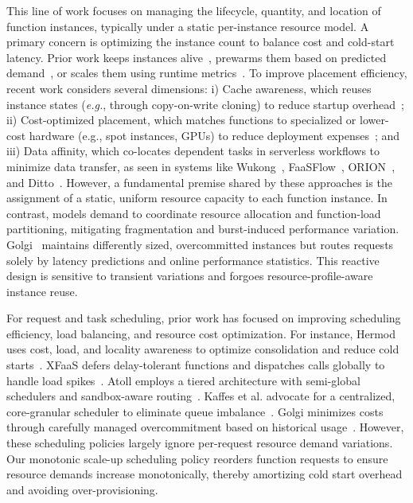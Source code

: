 This line of work focuses on managing the lifecycle, quantity, and location of function instances, typically under a static per-instance resource model. A primary concern is optimizing the instance count to balance cost and cold-start latency. Prior work keeps instances alive~\cite{ShahradFGCBCLTR20}, prewarms them based on predicted demand~\cite{ORION_MahgoubYSECB22, RoyPT22}, or scales them using runtime metrics~\cite{aws_scaling_window, aws_scaling_eq, knative_scaling, AQUATOPE_ZhouZD23}. To improve placement efficiency, recent work considers several dimensions: i) Cache awareness, which reuses instance states (\emph{e.g.}, through copy-on-write cloning) to reduce startup overhead~\cite{SOCK_OakesYZHHAA18, li2022help}; ii) Cost-optimized placement, which matches functions to specialized or lower-cost hardware (e.g., spot instances, GPUs) to reduce deployment expenses~\cite{RoyPT22, DuLJXZC22}; and iii) Data affinity, which co-locates dependent tasks in serverless workflows to minimize data transfer, as seen in systems like Wukong~\cite{Wukong_CarverZWAWC20}, FaaSFlow~\cite{FaaSFlow22}, ORION~\cite{ORION_MahgoubYSECB22}, and Ditto~\cite{JinZXZHLJ23}. However, a fundamental premise shared by these approaches is the assignment of a static, uniform resource capacity to each function instance. In contrast, \sysname models demand to coordinate resource allocation and function-load partitioning, mitigating fragmentation and burst-induced performance variation. Golgi~\cite{soccGolgi} maintains differently sized, overcommitted instances but routes requests solely by latency predictions and online performance statistics. This reactive design is sensitive to transient variations and forgoes resource-profile-aware instance reuse.

For request and task scheduling, prior work has focused on improving scheduling efficiency, load balancing, and resource cost optimization. For instance, Hermod uses cost, load, and locality awareness to optimize consolidation and reduce cold starts~\cite{SoCC22:Hermod}. XFaaS defers delay-tolerant functions and dispatches calls globally to handle load spikes~\cite{sahraei2023xfaas}. Atoll employs a tiered architecture with semi-global schedulers and sandbox-aware routing~\cite{soccAtoll}. Kaffes et al. advocate for a centralized, core-granular scheduler to eliminate queue imbalance~\cite{soccKaffes}. Golgi minimizes costs through carefully managed overcommitment based on historical usage~\cite{soccGolgi}. However, these scheduling policies largely ignore per-request resource demand variations. Our monotonic scale-up scheduling policy reorders function requests to ensure resource demands increase monotonically, thereby amortizing cold start overhead and avoiding over-provisioning.
